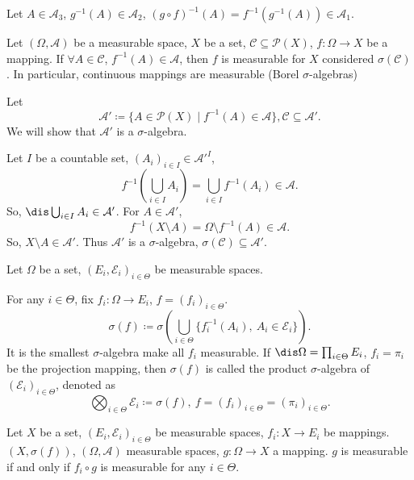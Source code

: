 \begin{proofenv}
    Let $A\in \mathcal{A}_3$, $g^{-1}(A)\in \mathcal{A}_2$, $(g\circ f)^{-1}(A)=f^{-1}(g^{-1}(A))\in \mathcal{A}_1$.
\end{proofenv}
\begin{propositionenv}
    Let $(\Omega,\mathcal{A})$ be a measurable space, $X$ be a set, $\mathcal{C}\subseteq \mathscr{P}(X)$, $f:\Omega\longrightarrow X$ be a mapping. If $\forall A\in \mathcal{C}$, $f^{-1}(A)\in \mathcal{A}$, then $f$ is measurable for $X$ considered $\sigma(\mathcal{C})$. In particular, continuous mappings are measurable (Borel $\sigma$-algebras)
\end{propositionenv}
\begin{proofenv}
    Let 
    $$\mathcal{A}'\coloneq \{A\in \mathscr{P}(X)\mid f^{-1}(A)\in \mathcal{A}\}, \mathcal{C}\subseteq \mathcal{A}'.$$
    We will show that $\mathcal{A}'$ is a $\sigma$-algebra. 

    \quad Let $I$ be a countable set, $(A_i)_{i\in I}\in \mathcal{A}'^{I}$,
    $$ f^{-1}\left(\bigcup_{i\in I}A_i\right)=\bigcup_{i\in I}f^{-1}(A_i)\in \mathcal{A}.$$
    So, $\dis \bigcup_{i\in I}A_i\in \mathcal{A}'$. For $A\in \mathcal{A}'$,
    $$ f^{-1}\left(X\setminus A\right)=\Omega\setminus f^{-1}(A)\in \mathcal{A}.$$
    So, $X\setminus A\in \mathcal{A}'$. Thus $\mathcal{A}'$ is a $\sigma$-algebra, $\sigma(\mathcal{C})\subseteq \mathcal{A}'$.
\end{proofenv}
\begin{definitionenv}
    Let $\Omega$ be a set, $(E_i,\mathcal{E}_i)_{i\in \Theta}$ be measurable spaces. 
    
    \quad For any $i\in \Theta$, fix $f_i:\Omega\longrightarrow E_i$, $f=(f_i)_{i\in \Theta}$.
    $$ \sigma(f)\coloneq \sigma\left(\bigcup_{i\in \Theta}\{f_i^{-1}(A_i),\ A_i\in \mathcal{E}_i\}\right).$$
    It is the smallest $\sigma$-algebra make all $f_i$ measurable. If $\dis \Omega=\prod_{i\in \Theta}E_i$, $f_i=\pi_i$ be the projection mapping, then $\sigma(f)$ is called the product $\sigma$-algebra of $(\mathcal{E}_i)_{i\in \Theta}$, denoted as 
    $$ \bigotimes_{i\in \Theta} \mathcal{E}_i\coloneq \sigma(f),\ f=(f_i)_{i\in \Theta}=(\pi_i)_{i\in \Theta}.$$
\end{definitionenv}
\begin{propositionenv}
    Let $X$ be a set, $(E_i,\mathcal{E}_i)_{i\in \Theta}$ be measurable spaces, $f_i:X\longrightarrow E_i$ be mappings. $(X,\sigma(f))$, $(\Omega, \mathcal{A})$ measurable spaces, $g:\Omega\longrightarrow X$ a mapping. $g$ is measurable if and only if $f_i\circ g$ is measurable for any $i\in \Theta$.
\end{propositionenv}
